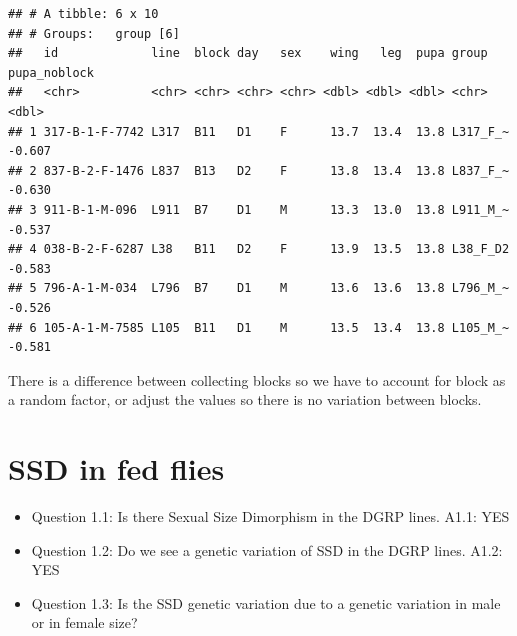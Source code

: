 \documentclass[
]{article}
\newenvironment{Shaded}{\begin{snugshade}}{\end{snugshade}}
\newcommand{\CommentTok}[1]{\textcolor[rgb]{0.56,0.35,0.01}{\textit{#1}}}
\newcommand{\KeywordTok}[1]{\textcolor[rgb]{0.13,0.29,0.53}{\textbf{#1}}}
\newcommand{\NormalTok}[1]{#1}
\newcommand{\OperatorTok}[1]{\textcolor[rgb]{0.81,0.36,0.00}{\textbf{#1}}}
\newcommand{\StringTok}[1]{\textcolor[rgb]{0.31,0.60,0.02}{#1}}
\providecommand{\tightlist}{%
  \setlength{\itemsep}{0pt}\setlength{\parskip}{0pt}}
\begin{document}
\begin{Shaded}
\end{Shaded}

\begin{verbatim}
## # A tibble: 6 x 10
## # Groups:   group [6]
##   id             line  block day   sex    wing   leg  pupa group    pupa_noblock
##   <chr>          <chr> <chr> <chr> <chr> <dbl> <dbl> <dbl> <chr>           <dbl>
## 1 317-B-1-F-7742 L317  B11   D1    F      13.7  13.4  13.8 L317_F_~       -0.607
## 2 837-B-2-F-1476 L837  B13   D2    F      13.8  13.4  13.8 L837_F_~       -0.630
## 3 911-B-1-M-096  L911  B7    D1    M      13.3  13.0  13.8 L911_M_~       -0.537
## 4 038-B-2-F-6287 L38   B11   D2    F      13.9  13.5  13.8 L38_F_D2       -0.583
## 5 796-A-1-M-034  L796  B7    D1    M      13.6  13.6  13.8 L796_M_~       -0.526
## 6 105-A-1-M-7585 L105  B11   D1    M      13.5  13.4  13.8 L105_M_~       -0.581
\end{verbatim}

\begin{Shaded}
\end{Shaded}

There is a difference between collecting blocks so we have to account
for block as a random factor, or adjust the values so there is no
variation between blocks.

\hypertarget{ssd-in-fed-flies}{%
\section{SSD in fed flies}\label{ssd-in-fed-flies}}

\begin{itemize}
\tightlist
\item
  Question 1.1: Is there Sexual Size Dimorphism in the DGRP lines. A1.1:
  YES
\item
  Question 1.2: Do we see a genetic variation of SSD in the DGRP lines.
  A1.2: YES
\item
  Question 1.3: Is the SSD genetic variation due to a genetic variation
  in male or in female size?
\end{itemize}
\end{document}
